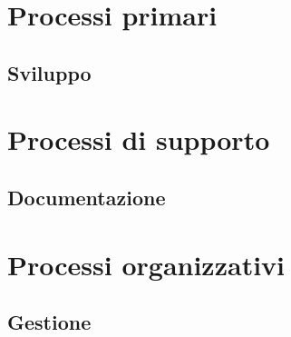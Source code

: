 \documentclass[a4paper,titlepage]{article}
\begin{document}
\newpage
\tableofcontents
\listoffigures
\newpage


\section{Processi primari}
 \subsection{Sviluppo}
  
\section{Processi di supporto} 
 \subsection{Documentazione}  
 
 \subsection{} 
  
\newpage
\section{Processi organizzativi}
 \subsection{Gestione}
  
\end{document}
